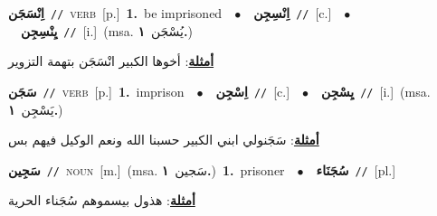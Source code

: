 \documentclass[10pt,a4paper,twoside]{article} %
\begin{document}
\begin{multicols}{2}
{\setlength\topsep{0pt}\textbf{\foreignlanguage{arabic}{اِنْسَجَن}}\ {\color{gray}\texttt{//}\color{black}}\ \textsc{verb}\ [p.]\ \textbf{1.}~be imprisoned\ \ $\bullet$\ \ \setlength\topsep{0pt}\textbf{\foreignlanguage{arabic}{اِنْسِجِن}}\ {\color{gray}\texttt{//}\color{black}}\ [c.]\ \ $\bullet$\ \ \setlength\topsep{0pt}\textbf{\foreignlanguage{arabic}{يِنْسِجِن}}\ {\color{gray}\texttt{//}\color{black}}\ [i.]\ \color{gray}(msa. \foreignlanguage{arabic}{يُسْجَن}~\foreignlanguage{arabic}{\textbf{١.}})\color{black}\  \begin{flushright}\color{gray}\foreignlanguage{arabic}{\textbf{\underline{\foreignlanguage{arabic}{أمثلة}}}: أخوها الكبير انْسَجَن بتهمة التزوير}\end{flushright}\color{black}} \vspace{2mm}

{\setlength\topsep{0pt}\textbf{\foreignlanguage{arabic}{سَجَن}}\ {\color{gray}\texttt{//}\color{black}}\ \textsc{verb}\ [p.]\ \textbf{1.}~imprison\ \ $\bullet$\ \ \setlength\topsep{0pt}\textbf{\foreignlanguage{arabic}{اِسْجِن}}\ {\color{gray}\texttt{//}\color{black}}\ [c.]\ \ $\bullet$\ \ \setlength\topsep{0pt}\textbf{\foreignlanguage{arabic}{يِسْجِن}}\ {\color{gray}\texttt{//}\color{black}}\ [i.]\ \color{gray}(msa. \foreignlanguage{arabic}{يَسْجِن}~\foreignlanguage{arabic}{\textbf{١.}})\color{black}\  \begin{flushright}\color{gray}\foreignlanguage{arabic}{\textbf{\underline{\foreignlanguage{arabic}{أمثلة}}}: سَجَنولي ابني الكبير حسبنا الله ونعم الوكيل فيهم بس}\end{flushright}\color{black}} \vspace{2mm}

{\setlength\topsep{0pt}\textbf{\foreignlanguage{arabic}{سَجِين}}\ {\color{gray}\texttt{//}\color{black}}\ \textsc{noun}\ [m.]\ \color{gray}(msa. \foreignlanguage{arabic}{سَجين}~\foreignlanguage{arabic}{\textbf{١.}})\color{black}\ \textbf{1.}~prisoner\ \ $\bullet$\ \ \setlength\topsep{0pt}\textbf{\foreignlanguage{arabic}{سُجَنَاء}}\ {\color{gray}\texttt{//}\color{black}}\ [pl.]\  \begin{flushright}\color{gray}\foreignlanguage{arabic}{\textbf{\underline{\foreignlanguage{arabic}{أمثلة}}}: هذول بيسموهم سُجَناء الحرية}\end{flushright}\color{black}} \vspace{2mm}


\end{multicols}
\end{document}
